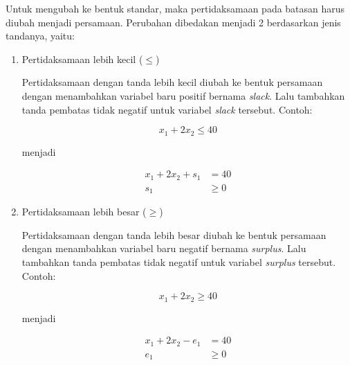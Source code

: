 		

	
		Untuk mengubah ke bentuk standar, maka pertidaksamaan pada batasan harus diubah menjadi persamaan. Perubahan dibedakan menjadi 2 berdasarkan jenis tandanya, yaitu:
		
		\begin{enumerate}
			\item Pertidaksamaan lebih kecil (\(\leq\))		

				Pertidaksamaan dengan tanda lebih kecil diubah ke bentuk persamaan dengan menambahkan variabel baru positif bernama \textit{slack}. Lalu tambahkan tanda pembatas tidak negatif untuk variabel \textit{slack} tersebut. Contoh:
				
				\begin{equation*}
					x_1 + 2x_2 \leq 40
				\end{equation*}
				
				menjadi
				
				\begin{equation*}
					\begin{split}
						x_1 + 2x_2 + s_1 &= 40\\
						s_1 &\geq 0
					\end{split}
				\end{equation*}
			
			\item Pertidaksamaan lebih besar (\(\geq\))
			
				Pertidaksamaan dengan tanda lebih besar diubah ke bentuk persamaan dengan menambahkan variabel baru negatif bernama \textit{surplus}. Lalu tambahkan tanda pembatas tidak negatif untuk variabel \textit{surplus} tersebut. Contoh:
				
				\begin{equation*}
					x_1 + 2x_2 \geq 40
				\end{equation*}
				
				menjadi
				
				\begin{equation*}
					\begin{split}
						x_1 + 2x_2 - e_1 &= 40\\
						e_1 &\geq 0
					\end{split}
				\end{equation*}
		\end{enumerate}
		
